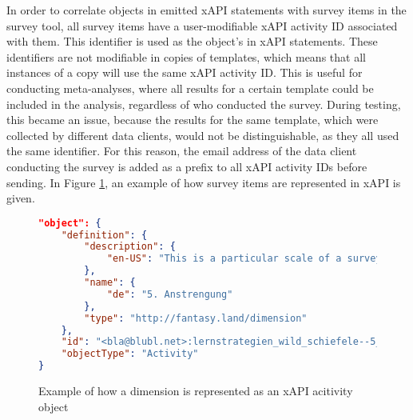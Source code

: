     In order to correlate objects in emitted xAPI statements with survey
    items in the survey tool, all survey items have a user-modifiable
    xAPI activity ID associated with them. This identifier is
    used as the object's  in xAPI statements.
    These identifiers are not modifiable in copies of templates,
    which means that all instances of a copy will use the same xAPI
    activity ID. This is useful for conducting meta-analyses, where
    all results for a certain template could be included in the analysis,
    regardless of who conducted the survey. During testing, this
    became an issue, because the results for the same template,
    which were collected by different data clients, would not be distinguishable,
    as they all used the same identifier. For this reason,
    the email address of the data client conducting the survey
    is added as a prefix to all xAPI activity IDs before sending.
    In Figure \ref{fig:example-xapi-activity-dimension}, an example
    of how survey items are represented in xAPI is given. 

    \begin{figure}
        \begin{lstlisting}[language=JSON]
"object": {
    "definition": {
        "description": {
            "en-US": "This is a particular scale of a survey, it usually contains multiple questions."
        },
        "name": {
            "de": "5. Anstrengung"
        },
        "type": "http://fantasy.land/dimension"
    },
    "id": "<bla@blubl.net>:lernstrategien_wild_schiefele--5_anstrengung",
    "objectType": "Activity"
}
        \end{lstlisting}
        \caption{Example of how a dimension is represented as an xAPI acitivity object}
        \label{fig:example-xapi-activity-dimension}
    \end{figure}

